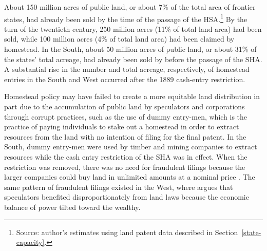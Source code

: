 \documentclass[12pt]{article}
\begin{document}
About 150 million acres of public land, or about 7\% of the total area of frontier states, had already been sold by the time of the passage of the HSA.\footnote{Source: author's estimates using land patent data described in Section~\ref{state-capacity}.} By the turn of the twentieth century, 250 million acres (11\% of total land area) had been sold, while 100 million acres (4\% of total land area) had been claimed by homestead. In the South, about 50 million acres of public land, or about 31\% of the states' total acreage, had already been sold by before the passage of the SHA. A substantial rise in the number and total acreage, respectively, of homestead entries in the South and West occurred after the 1889 cash-entry restriction.

Homestead policy may have failed to create a more equitable land distribution in part due to the accumulation of public land by speculators and corporations through corrupt practices, such as the use of dummy entry-men, which is the practice of paying individuals to stake out a homestead in order to extract resources from the land with no intention of filing for the final patent. In the South, dummy entry-men were used by timber and mining companies to extract resources while the cash entry restriction of the SHA was in effect. When the restriction was removed, there was no need for fraudulent filings because the larger companies could buy land in unlimited amounts at a nominal price \citep{gates1940federal, gates1979federal}. The same pattern of fraudulent filings existed in the West, where \citet[pps. 216-218]{murtazashvili2013political} argues that speculators benefited disproportionately from land laws because the economic balance of power tilted toward the wealthy.%

	
\end{document}

